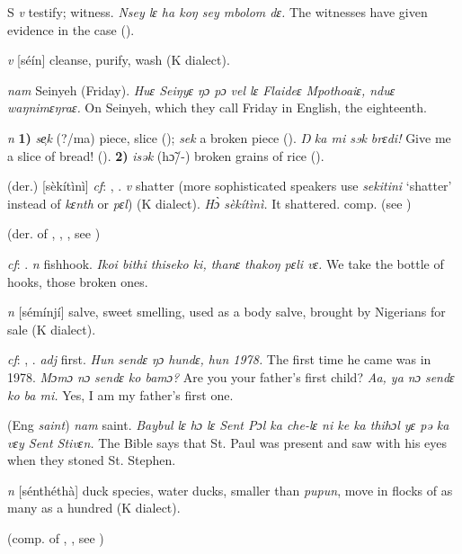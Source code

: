 \begin{letter}{S}
 \textit{v} testify; witness. \textit{Nsey lɛ ha koŋ sey mbolom dɛ.} The witnesses have given evidence in the case (\citealt{Pichl1967}). 

 \textit{v} [séín] cleanse, purify, wash (K dialect). 

 \textit{nam} Seinyeh (Friday). \textit{Huɛ Seiŋyɛ ŋɔ pɔ vel lɛ Flaideɛ Mpothoaiɛ, nduɛ waŋnimɛŋraɛ.} On Seinyeh, which they call Friday in English, the eighteenth.

 \textit{n} \textbf{1)} \textit{se̹k} (?/ma) piece, slice (\citealt{Sumner1921}); \textit{sek} a broken piece (\citealt{Sumner1921}). \textit{Ŋ ka mi sɘk brɛdi!} Give me a slice of bread! (\citealt{Pichl1967}). \textbf{2)} \textit{isək} (hɔ̃/-) broken grains of rice (\citealt{Pichl1967}).

 (der.) [sèkítìnì] \textit{cf}: , . \textit{v} shatter (more sophisticated speakers use \textit{sekitini} ‘shatter' instead of \textit{kɛnth} or \textit{pɛl}) (K dialect). \textit{Hɔ̀ sèkítìnì.} It shattered. comp.  (see ) 

 (der. of , , , see )

 \textit{cf}: . \textit{n} fishhook. \textit{Ikoi bithi thiseko ki, thanɛ thakoŋ pɛli vɛ.} We take the bottle of hooks, those broken ones.

 \textit{n} [sémínjí] salve, sweet smelling, used as a body salve, brought by Nigerians for sale (K dialect). 

 \textit{cf}: , . \textit{adj} first. \textit{Hun sendɛ ŋɔ hundɛ, hun 1978.} The first time he came was in 1978. \textit{Mɔmɔ nɔ sendɛ ko bamɔ?} Are you your father's first child? \textit{Aa, ya nɔ sendɛ ko ba mi.} Yes, I am my father's first one.

 (Eng \textit{saint}) \textit{nam} saint. \textit{Baybul lɛ hɔ lɛ Sent Pɔl ka che-lɛ ni ke ka thihɔl yɛ pə ka vɛy Sent Stivɛn.} The Bible says that St. Paul was present and saw with his eyes when they stoned St. Stephen.

 \textit{n} [sénthéthà] duck species, water ducks, smaller than \textit{pupun}, move in flocks of as many as a hundred (K dialect). 

 (comp. of , , see ) 


\end{letter}
